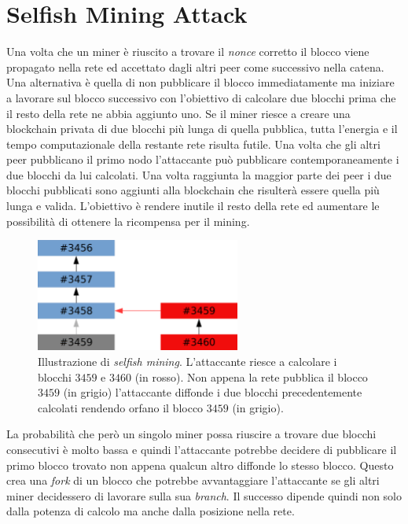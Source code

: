 \section{Selfish Mining Attack}
Una volta che un miner è riuscito a trovare il \textit{nonce} corretto il blocco viene propagato nella rete ed accettato dagli altri peer come successivo nella catena.\newline
Una alternativa è quella di non pubblicare il blocco immediatamente ma iniziare a lavorare sul blocco successivo con l'obiettivo di calcolare due blocchi prima che il resto della rete ne abbia aggiunto uno. Se il miner riesce a creare una blockchain privata di due blocchi più lunga di quella pubblica, tutta l'energia e il tempo computazionale della restante rete risulta futile. Una volta che gli altri peer pubblicano il primo nodo l'attaccante può pubblicare contemporaneamente i due blocchi da lui calcolati. Una volta raggiunta la maggior parte dei peer i due blocchi pubblicati sono aggiunti alla blockchain che risulterà essere quella più lunga e valida. L'obiettivo è rendere inutile il resto della rete ed aumentare le possibilità di ottenere la ricompensa per il mining.
\begin{figure}[H]
    \centering
    \includegraphics[width=0.6\textwidth]{images/selfish.png}
    \caption{Illustrazione di \textit{selfish mining}. L'attaccante riesce a calcolare i blocchi $3459$ e $3460$ (in rosso). Non appena la rete pubblica il blocco $3459$ (in grigio) l'attaccante diffonde i due blocchi precedentemente calcolati rendendo orfano il blocco $3459$ (in grigio).}
\end{figure}
La probabilità che però un singolo miner possa riuscire a trovare due blocchi consecutivi è molto bassa e quindi l'attaccante potrebbe decidere di pubblicare il primo blocco trovato non appena qualcun altro diffonde lo stesso blocco. Questo crea una \textit{fork} di un blocco che potrebbe avvantaggiare l'attaccante se gli altri miner decidessero di lavorare sulla sua \textit{branch}. Il successo dipende quindi non solo dalla potenza di calcolo ma anche dalla posizione nella rete.

